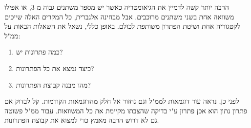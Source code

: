 \documentclass[
  hebrew,
  12pt,
  a4paper,
  oneside]{book}
\theoremstyle{definition}
\theoremstyle{remark}
\theoremstyle{plain}
\theoremstyle{remark}
\begin{document}
הרבה יותר קשה לדמיין את הגיאומטריה כאשר יש מספר משתנים גבוה מ-\(3\), או
אפילו משוואה אחת בשני משתנים מרוכבים. אבל מבחינה אלגברית, כל המקרים האלה
שייכים לקטגוריה אחת ושיטת הפתרון משותפת לכולם. באופן כללי, נשאל את
השאלות הבאות על ממ"ל:

\begin{enumerate}
\def\labelenumi{\arabic{enumi}.}
\item
  כמה פתרונות יש?
\item
  כיצד נמצא את כל הפתרונות?
\item
  מהו מבנה קבוצת הפתרונות?
\end{enumerate}

לפני כן, נראה עוד דוגמאות לממ"ל וגם נחזור אל חלק מהדוגמאות הקודמות. קל
לבדוק אם פתרון נתון הוא אכן פתרון ע"י בדיקה שהצבתו מקיימת את כל
המשוואות. עבור ממ"ל פשוטה גם לא דרוש הרבה מאמץ כדי למצוא את קבוצת
הפתרונות.
\end{document}
